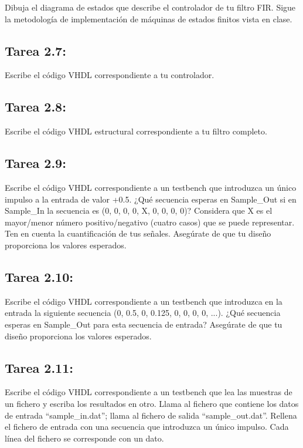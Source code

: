 \documentclass{article}
\begin{document}
Dibuja el diagrama de estados que describe el controlador de tu filtro FIR. Sigue la metodología de implementación de máquinas de estados finitos vista en clase.

\subsection{Tarea 2.7:}

Escribe el código VHDL correspondiente a tu controlador.

\subsection{Tarea 2.8:}

Escribe el código VHDL estructural correspondiente a tu filtro completo.

\subsection{Tarea 2.9:}

Escribe el código VHDL correspondiente a un testbench que introduzca un único impulso a la entrada de valor +0.5. ¿Qué secuencia esperas en Sample{\_}Out si en Sample{\_}In la secuencia es (0, 0, 0, 0, X, 0, 0, 0, 0)? Considera que X es el mayor/menor número positivo/negativo (cuatro casos) que se puede representar. Ten en cuenta la cuantificación
de tus señales. Asegúrate de que tu diseño proporciona los valores esperados.

\subsection{Tarea 2.10:}

Escribe el código VHDL correspondiente a un testbench que introduzca en la entrada
la siguiente secuencia (0, 0.5, 0, 0.125, 0, 0, 0, 0, ...). ¿Qué secuencia esperas en Sample{\_}Out para esta secuencia de entrada? Asegúrate de que tu diseño proporciona los valores esperados.

\subsection{Tarea 2.11:}
Escribe el código VHDL correspondiente a un testbench que lea las muestras de un fichero y escriba los resultados en otro.
Llama al fichero que contiene los datos de entrada “sample{\_}in.dat”; llama al fichero de salida “sample{\_}out.dat”.
Rellena el fichero de entrada con una secuencia que introduzca un único impulso.
Cada línea del fichero se corresponde con un dato.
\end{document}
